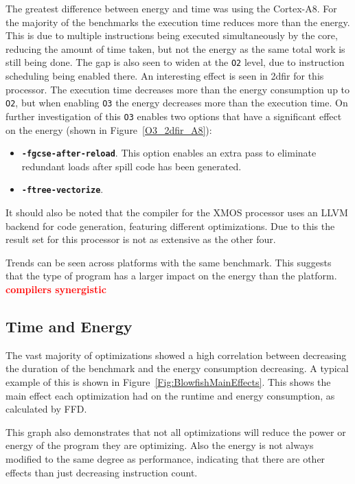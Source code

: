 \documentclass[twocolumn]{article}
\newcommand{\todo}[1]{\textbf{\textcolor{red}{#1}}}
\begin{document}
The greatest difference between energy and time was using the Cortex-A8. For the majority of the benchmarks the execution time reduces more than the energy. This is due to multiple instructions being executed simultaneously by the core, reducing the amount of time taken, but not the energy as the same total work is still being done. The gap is also seen to widen at the \texttt{O2} level, due to instruction scheduling being enabled there. An interesting effect is seen in 2dfir for this processor. The execution time decreases more than the energy consumption up to \texttt{O2}, but when enabling \texttt{O3} the energy decreases more than the execution time. On further investigation of this \texttt{O3} enables two options that have a significant effect on the energy (shown in Figure~\ref{O3_2dfir_A8}):
\begin{itemize}
	\item \texttt{\bfseries -fgcse-after-reload}. This option enables an extra pass to eliminate redundant loads after spill code has been generated.
	\item \texttt{\bfseries -ftree-vectorize}.
\end{itemize}

It should also be noted that the compiler for the XMOS processor uses an LLVM backend for code generation, featuring different optimizations. Due to this the result set for this processor is not as extensive as the other four.

Trends can be seen across platforms with the same benchmark. This suggests that the type of program has a larger impact on the energy than the platform. \todo{compilers synergistic}

\subsection*{Time and Energy}



The vast majority of optimizations showed a high correlation between decreasing the duration of the benchmark and the energy consumption decreasing. A typical example of this is shown in Figure~\ref{Fig:BlowfishMainEffects}. This shows the main effect each optimization had on the runtime and energy consumption, as calculated by FFD.

This graph also demonstrates that not all optimizations will reduce the power or energy of the program they are optimizing. Also the energy is not always modified to the same degree as performance, indicating that there are other effects than just decreasing instruction count.
\end{document}
